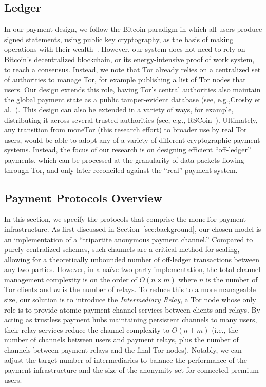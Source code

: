 \subsection{Ledger}

In our payment design, we follow the Bitcoin paradigm in which all users produce signed statements, using public key cryptography, as the basis of making operations with their wealth~\cite{nakamoto2008bitcoin}.
However, our system does not need to rely on Bitcoin's decentralized blockchain, or its energy-intensive proof of work system, to reach a consensus.
Instead, we note that Tor already relies on a centralized set of authorities to manage Tor, for example publishing a list of Tor nodes that users.
Our design extends this role, having Tor's central authorities also maintain the global payment state as a public tamper-evident database (see, e.g.,Crosby et al.~\cite{crosby2009efficient}). 
This design can also be extended in a variety of ways, for example, distributing it across several trusted authorities (see, e.g., RSCoin~\cite{danezis2015centrally}).
Ultimately, any transition from moneTor (this research effort) to broader use by real Tor users, would be able to adopt any of a variety of different cryptographic payment systems. 
Instead, the focus of our research is on designing efficient ``off-ledger'' payments, which can be processed at the granularity of data packets flowing through Tor, and only later reconciled against the ``real'' payment system.

\subsection{Payment Protocols Overview}
\label{sec:payment_overview}

In this section, we specify the protocols that comprise the moneTor payment infrastructure.
As first discussed in Section~\ref{sec:background}, our chosen model is an implementation of a ``tripartite anonymous payment channel.''
Compared to purely centralized schemes, such channels are a critical method for scaling, allowing for a theoretically unbounded number of off-ledger transactions between any two parties.
However, in a na\"{i}ve two-party implementation, the total channel management complexity is on the order of $O(n \times m)$ where $n$ is the number of Tor clients and $m$ is the number of relays.
To reduce this to a more manageable size, our solution is to introduce the {\em Intermediary Relay}, a Tor node whose only role is to provide atomic payment channel services between clients and relays.
By acting as trustless payment hubs maintaining persistent channels to many users, their relay services reduce the channel complexity to $O(n+m)$ (i.e., the number of channels between users and payment relays, plus the number of channels between payment relays and the final Tor nodes).
Notably, we can adjust the target number of intermediaries to balance the performance of the payment infrastructure and the size of the anonymity set for connected premium users.

